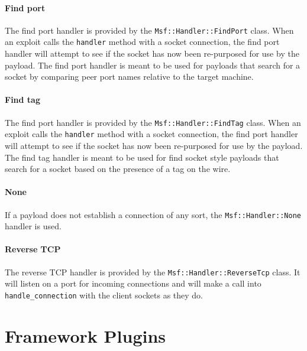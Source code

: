 \documentclass{report}
\begin{document}
            \subsubsection{Find port}

\par
The find port handler is provided by the
\texttt{Msf::Handler::FindPort} class.  When an exploit calls the
\texttt{handler} method with a socket connection, the find port
handler will attempt to see if the socket has now been re-purposed
for use by the payload.  The find port handler is meant to be used
for payloads that search for a socket by comparing peer port names
relative to the target machine.

            \subsubsection{Find tag}

\par
The find port handler is provided by the
\texttt{Msf::Handler::FindTag} class.  When an exploit calls the
\texttt{handler} method with a socket connection, the find port
handler will attempt to see if the socket has now been re-purposed
for use by the payload.  The find tag handler is meant to be used
for find socket style payloads that search for a socket based on the
presence of a tag on the wire.

            \subsubsection{None}

\par
If a payload does not establish a connection of any sort, the
\texttt{Msf::Handler::None} handler is used.

            \subsubsection{Reverse TCP}

\par
The reverse TCP handler is provided by the
\texttt{Msf::Handler::ReverseTcp} class.  It will listen on a port
for incoming connections and will make a call into
\texttt{handle\_connection} with the client sockets as they do.

\chapter{Framework Plugins}
\label{framework-plugins}
\end{document}
